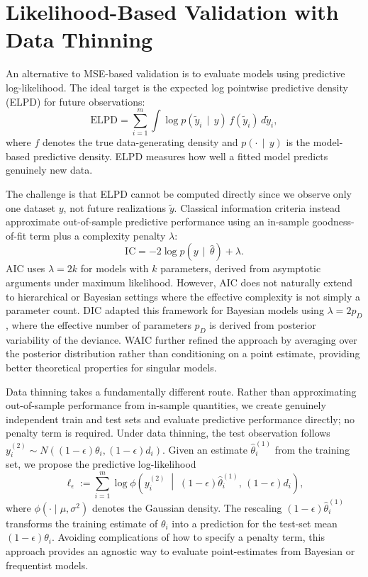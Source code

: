 \documentclass[11pt]{article}
\newcommand{\given}{\,\mid\,}
\newcommand{\agiven}{\;\middle|\;}  %
\newcommand{\thetatrain}{\hat{\theta}^{(1)}}           %
\newcommand{\ytest}{y^{(2)}}                            %
\newcommand{\N}[2]{N\!\left(#1, #2\right)}
\theoremstyle{plain}
\theoremstyle{definition}
\theoremstyle{remark}
\begin{document}

\section{Likelihood-Based Validation with Data Thinning}\label{sec:likelihood}

An alternative to MSE-based validation is to evaluate models using predictive log-likelihood. The ideal target is the expected log pointwise predictive density (ELPD) \citep{vehtari_practical_2017} for future observations:
\[
\mathrm{ELPD} = \sum_{i=1}^m \int \log p(\tilde{y}_i \given y)\, f(\tilde{y}_i)\, d\tilde{y}_i,
\]
where $f$ denotes the true data-generating density and $p(\cdot \given y)$ is the model-based predictive density. ELPD measures how well a fitted model predicts genuinely new data.

The challenge is that ELPD cannot be computed directly since we observe only one dataset $y$, not future realizations $\tilde{y}$. Classical information criteria instead approximate out-of-sample predictive performance using an in-sample goodness-of-fit term plus a complexity penalty $\lambda$:
\[
\mathrm{IC} = -2\log p(y \given \hat{\theta}) + \lambda.
\]
AIC \citep{akaike_new_1974} uses $\lambda = 2k$ for models with $k$ parameters, derived from asymptotic arguments under maximum likelihood. However, AIC does not naturally extend to hierarchical or Bayesian settings where the effective complexity is not simply a parameter count. DIC \citep{spiegelhalter_bayesian_2002} adapted this framework for Bayesian models using $\lambda = 2p_D$, where the effective number of parameters $p_D$ is derived from posterior variability of the deviance. WAIC \citep{watanabe_asymptotic_2010} further refined the approach by averaging over the posterior distribution rather than conditioning on a point estimate, providing better theoretical properties for singular models.

Data thinning takes a fundamentally different route. Rather than approximating out-of-sample performance from in-sample quantities, we create genuinely independent train and test sets and evaluate predictive performance directly; no penalty term is required. Under data thinning, the test observation follows $\ytest_i \sim \N{(1-\epsilon)\theta_i}{(1-\epsilon)d_i}$. Given an estimate $\thetatrain_i$ from the training set, we propose the predictive log-likelihood
\[
\ell_{\epsilon} := \sum_{i=1}^m \log \phi\!\left( \ytest_i \agiven (1-\epsilon)\thetatrain_i,\, (1-\epsilon)d_i \right),
\]
where $\phi(\cdot \mid \mu, \sigma^2)$ denotes the Gaussian density. The rescaling $(1-\epsilon)\thetatrain_i$ transforms the training estimate
of $\theta_i$ into a prediction for the test-set mean $(1-\epsilon)\theta_i$. Avoiding complications of how to specify a penalty term, this approach provides an agnostic way to evaluate point-estimates from Bayesian or frequentist models.
\end{document}
